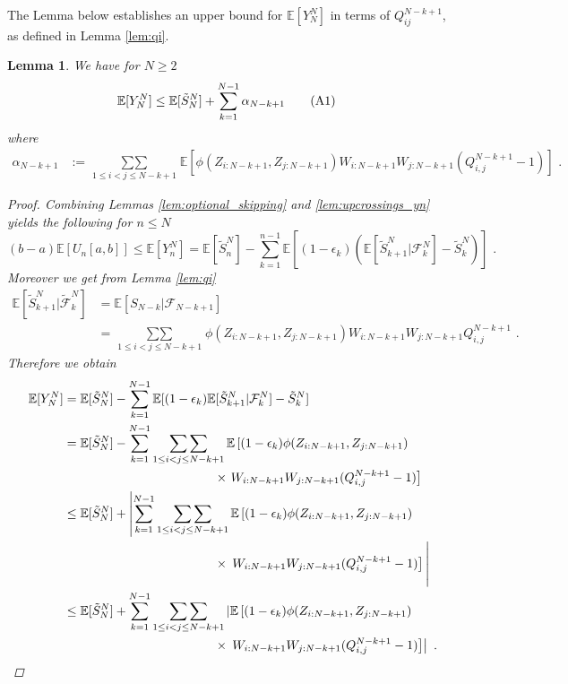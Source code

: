 \documentclass[phd]{UWMThesis}
\newcommand\numberthis{\addtocounter{equation}{1}\tag{\theequation}}
\newcommand{\E}{\mathbb{E}}
\newcommand{\F}{\mathcal{F}}
\newcommand{\sn}[1]{S_{#1}}
\newcommand{\StN}[1]{\tilde{S}_{#1}^N}
\newcommand{\FtN}[1]{\tilde{\F}_{#1}^N}
\newcommand{\mdot}{\textrm{ .}}
\renewcommand{\.}{\textrm{ .}}
\newcommand{\doublesum}{\mathop{\sum\sum}}
\newtheorem{lemma}[thm]{Lemma}
\theoremstyle{definition}
\numberwithin{thm}{chapter}
\begin{document}
%
The Lemma below establishes an upper bound for $\E[Y_N^N]$ in terms of $Q_{ij}^{N-k+1}$, as defined in Lemma \ref{lem:qi}. 
\begin{lemma} \label{lem:cs}
	We have for $N\geq 2$
	\begin{align*}
	\E[Y_N^N] &\leq \E[\StN{N}] + \sum_{k=1}^{N-1} \alpha_{N-k+1} \numberthis\label{eq:yn}
	\end{align*}
	where
	\begin{align*}
	\alpha_{N-k+1} &:= \doublesum\limits_{1\leq i<j\leq N-k+1}\E\left[\phi(Z_{i:N-k+1}, Z_{j:N-k+1}) W_{i:N-k+1} W_{j:N-k+1}(Q_{i,j}^{N-k+1} - 1)\right]\mdot
	\end{align*}
	\begin{proof}
		Combining Lemmas \ref{lem:optional_skipping} and \ref{lem:upcrossings_yn} yields the following for $n\leq N$
		$$(b-a) \E[U_n[a,b]] \leq \E[Y_n^N] = \E[\StN{n}] - \sum_{k=1}^{n-1} \E[(1-\epsilon_k) \left(\E[\StN{k+1} | \F_k^N] - \StN{k}\right)]\mdot$$
		Moreover we get from Lemma \ref{lem:qi}
		\begin{align*}
		\E[\StN{k+1}|\FtN{k}] &= \E[\sn{N-k} | \F_{N-k+1}]\\
		&= \doublesum\limits_{1\leq i<j\leq N-k+1} \phi(Z_{i:N-k+1}, Z_{j:N-k+1}) W_{i:N-k+1} W_{j:N-k+1} Q_{i,j}^{N-k+1}\mdot
		\end{align*}
		Therefore we obtain
		\begin{align*}
		\E[Y_N^N] &= \E[\StN{N}] - \sum_{k=1}^{N-1} \E[(1-\epsilon_k) \E[\StN{k+1} | \F_k^N] - \StN{k} ]\\
		&=  \E[\StN{N}] - \sum_{k=1}^{N-1} \doublesum\limits_{1\leq i<j\leq N-k+1} \E\left[(1-\epsilon_k)\phi(Z_{i:N-k+1}, Z_{j:N-k+1}) \right. \\
		&\qquad\qquad\qquad\qquad\qquad\qquad \times \left. W_{i:N-k+1} W_{j:N-k+1}(Q_{i,j}^{N-k+1} - 1) \right]\\
		&\leq  \E[\StN{N}] + \left|\sum_{k=1}^{N-1} \doublesum\limits_{1\leq i<j\leq N-k+1} \E\left[(1-\epsilon_k)\phi(Z_{i:N-k+1}, Z_{j:N-k+1}) \right.\right. \\
		&\qquad\qquad\qquad\qquad\qquad\qquad \times \left.\left. W_{i:N-k+1} W_{j:N-k+1}(Q_{i,j}^{N-k+1} - 1) \right]\vphantom{\doublesum\limits_{1\leq i<j\leq N-k+1}}\right|\\
		&\leq  \E[\StN{N}] + \sum_{k=1}^{N-1} \doublesum\limits_{1\leq i<j\leq N-k+1} \left|\E\left[(1-\epsilon_k)\phi(Z_{i:N-k+1}, Z_{j:N-k+1}) \right.\right. \\
		&\qquad\qquad\qquad\qquad\qquad\qquad \times \left.\left. W_{i:N-k+1} W_{j:N-k+1}(Q_{i,j}^{N-k+1} - 1) \right]\right|\mdot

\end{align*}
\end{proof}
\end{lemma}
\end{document}
